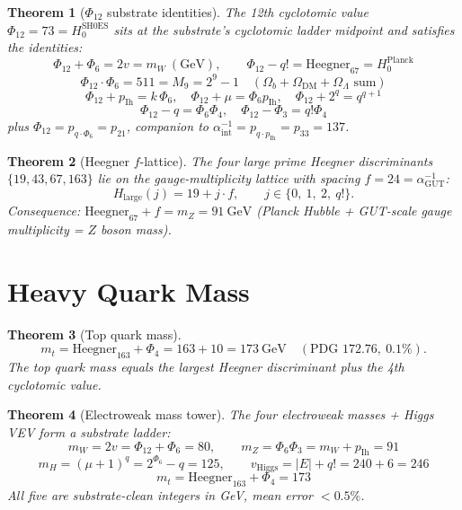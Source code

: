 \documentclass[11pt]{article}
\newtheorem{theorem}{Theorem}
\begin{document}
\begin{theorem}[$\Phi_{12}$ substrate identities]\label{thm:phi12_web}
The 12th cyclotomic value $\Phi_{12} = 73 = H_0^{\mathrm{SH0ES}}$
sits at the substrate's cyclotomic ladder midpoint and satisfies the
identities:
\[
  \Phi_{12} + \Phi_6 = 2v = m_W~\mathrm{(GeV)}, \qquad
  \Phi_{12} - q! = \mathrm{Heegner}_{67} = H_0^{\mathrm{Planck}}
\]
\[
  \Phi_{12} \cdot \Phi_6 = 511 = M_9 = 2^9-1 \quad (\Omega_b{+}\Omega_{\mathrm{DM}}{+}\Omega_\Lambda \text{ sum})
\]
\[
  \Phi_{12} + p_{\mathrm{Ih}} = k\,\Phi_6, \quad
  \Phi_{12} + \mu = \Phi_6 p_{\mathrm{Ih}}, \quad
  \Phi_{12} + 2^q = q^{q+1}
\]
\[
  \Phi_{12} - q = \Phi_6\Phi_4, \quad
  \Phi_{12} - \Phi_3 = q!\Phi_4
\]
plus $\Phi_{12} = p_{q\cdot\Phi_6} = p_{21}$, companion to
$\alpha^{-1}_{\text{int}} = p_{q\cdot p_{\mathrm{Ih}}} = p_{33} = 137$.
\end{theorem}

\begin{theorem}[Heegner $f$-lattice]\label{thm:heegner_flat}
The four large prime Heegner discriminants $\{19,43,67,163\}$ lie on
the gauge-multiplicity lattice with spacing $f = 24 = \alpha^{-1}_{\mathrm{GUT}}$:
\[
  H_{\text{large}}(j) = 19 + j \cdot f, \qquad j \in \{0,\ 1,\ 2,\ q!\}.
\]
Consequence: $\mathrm{Heegner}_{67} + f = m_Z = 91~\mathrm{GeV}$
(Planck Hubble + GUT-scale gauge multiplicity = $Z$ boson mass).
\end{theorem}

\section{Heavy Quark Mass}\label{sec:heavy_quark}

\begin{theorem}[Top quark mass]\label{thm:m_top}
\[
  m_t = \mathrm{Heegner}_{163} + \Phi_4 = 163 + 10 = 173~\mathrm{GeV}
  \quad (\text{PDG } 172.76,\ 0.1\%).
\]
The top quark mass equals the largest Heegner discriminant plus the
4th cyclotomic value.
\end{theorem}

\begin{theorem}[Electroweak mass tower]\label{thm:ew_masses}
The four electroweak masses + Higgs VEV form a substrate ladder:
\[
  m_W = 2v = \Phi_{12} + \Phi_6 = 80, \qquad
  m_Z = \Phi_6 \Phi_3 = m_W + p_{\mathrm{Ih}} = 91
\]
\[
  m_H = (\mu+1)^q = 2^{\Phi_6} - q = 125, \qquad
  v_{\mathrm{Higgs}} = |E| + q! = 240 + 6 = 246
\]
\[
  m_t = \mathrm{Heegner}_{163} + \Phi_4 = 173
\]
All five are substrate-clean integers in GeV, mean error $< 0.5\%$.
\end{theorem}
\end{document}
